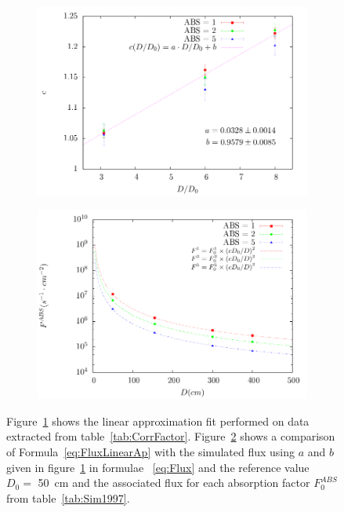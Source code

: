 	\begin{figure}[H]
		\begin{subfigure}{\linewidth}
			\centering
			\includegraphics[width = 0.8\plotwidth]{fig/chapt5/flux_correction.pdf}\\
			\caption{\label{fig:CorrFactor:A}}
		\end{subfigure}
		\begin{subfigure}{\linewidth}
			\centering
			\includegraphics[width = 0.8\plotwidth]{fig/chapt5/correction_model.pdf}
			\caption{\label{fig:CorrFactor:B}}
		\end{subfigure}
		\caption{\label{fig:CorrFactor} Figure~\ref{fig:CorrFactor:A} shows the linear approximation fit performed on data extracted from table~\ref{tab:CorrFactor}. Figure~\ref{fig:CorrFactor:B} shows a comparison of Formula~\ref{eq:FluxLinearAp} with the simulated flux using $a$ and $b$ given in figure~\ref{fig:CorrFactor:A} in formulae ~\ref{eq:Flux} and the reference value $D_0 =$ \SI{50}{cm} and the associated flux for each absorption factor $F_0^{ABS}$ from table~\ref{tab:Sim1997}.}
	\end{figure}
	

